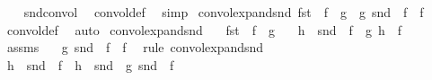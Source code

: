 \begin{isabellebody}
%
\isadelimproof
\ \ %
\endisadelimproof
%
\isatagproof
{}\isamarkupfalse%
\ snd{\isacharunderscore}{\kern0pt}convol\ \isamarkupfalse%
\ convol{\isacharunderscore}{\kern0pt}def\ \isamarkupfalse%
\ simp%
\endisatagproof
{\isafoldproof}%
%
\isadelimproof
\isanewline
%
\endisadelimproof
\isanewline
{}\isamarkupfalse%
\ convol{\isacharunderscore}{\kern0pt}expand{\isacharunderscore}{\kern0pt}snd{\isacharcolon}{\kern0pt}\ {\isachardoublequoteopen}fst\ {\isasymcirc}\ f\ {\isacharequal}{\kern0pt}\ g\ {\isasymLongrightarrow}\ {\isasymlangle}g{\isacharcomma}{\kern0pt}\ snd\ {\isasymcirc}\ f{\isasymrangle}\ {\isacharequal}{\kern0pt}\ f{\isachardoublequoteclose}\isanewline
%
\isadelimproof
\ \ %
\endisadelimproof
%
\isatagproof
{}\isamarkupfalse%
\ convol{\isacharunderscore}{\kern0pt}def\ \isamarkupfalse%
\ auto%
\endisatagproof
{\isafoldproof}%
%
\isadelimproof
\isanewline
%
\endisadelimproof
\isanewline
{}\isamarkupfalse%
\ convol{\isacharunderscore}{\kern0pt}expand{\isacharunderscore}{\kern0pt}snd{\isacharprime}{\kern0pt}{\isacharcolon}{\kern0pt}\isanewline
\ \ \ {\isachardoublequoteopen}{\isacharparenleft}{\kern0pt}fst\ {\isasymcirc}\ f\ {\isacharequal}{\kern0pt}\ g{\isacharparenright}{\kern0pt}{\isachardoublequoteclose}\isanewline
\ \ \ {\isachardoublequoteopen}h\ {\isacharequal}{\kern0pt}\ snd\ {\isasymcirc}\ f\ {\isasymlongleftrightarrow}\ {\isasymlangle}g{\isacharcomma}{\kern0pt}\ h{\isasymrangle}\ {\isacharequal}{\kern0pt}\ f{\isachardoublequoteclose}\isanewline
%
\isadelimproof
%
\endisadelimproof
%
\isatagproof
{}\isamarkupfalse%
\ {\isacharminus}{\kern0pt}\isanewline
\ \ \isamarkupfalse%
\ assms\ \isamarkupfalse%
\ {\isacharasterisk}{\kern0pt}{\isacharcolon}{\kern0pt}\ {\isachardoublequoteopen}{\isasymlangle}g{\isacharcomma}{\kern0pt}\ snd\ {\isasymcirc}\ f{\isasymrangle}\ {\isacharequal}{\kern0pt}\ f{\isachardoublequoteclose}\ \isamarkupfalse%
\ {\isacharparenleft}{\kern0pt}rule\ convol{\isacharunderscore}{\kern0pt}expand{\isacharunderscore}{\kern0pt}snd{\isacharparenright}{\kern0pt}\isanewline
\ \ \isamarkupfalse%
\ \isamarkupfalse%
\ {\isachardoublequoteopen}h\ {\isacharequal}{\kern0pt}\ snd\ {\isasymcirc}\ f\ {\isasymlongleftrightarrow}\ h\ {\isacharequal}{\kern0pt}\ snd\ {\isasymcirc}\ {\isasymlangle}g{\isacharcomma}{\kern0pt}\ snd\ {\isasymcirc}\ f{\isasymrangle}{\isachardoublequoteclose}\ \isamarkupfalse%

\end{isabellebody}
